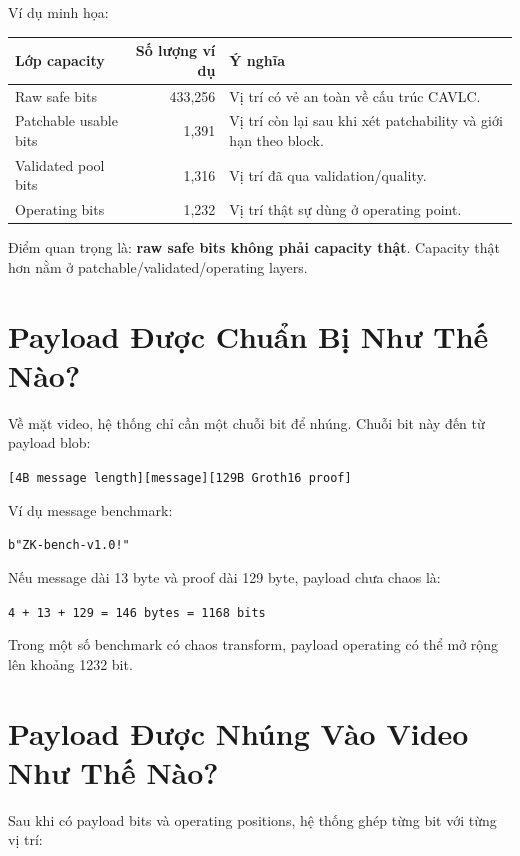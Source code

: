 \documentclass[11pt,a4paper]{article}
\begin{document}
Ví dụ minh họa:

\begin{center}
\begin{tabular}{lrp{70mm}}
\toprule
Lớp capacity & Số lượng ví dụ & Ý nghĩa \\
\midrule
Raw safe bits & 433,256 & Vị trí có vẻ an toàn về cấu trúc CAVLC. \\
Patchable usable bits & 1,391 & Vị trí còn lại sau khi xét patchability và giới hạn theo block. \\
Validated pool bits & 1,316 & Vị trí đã qua validation/quality. \\
Operating bits & 1,232 & Vị trí thật sự dùng ở operating point. \\
\bottomrule
\end{tabular}
\end{center}

Điểm quan trọng là: \textbf{raw safe bits không phải capacity thật}. Capacity
thật hơn nằm ở patchable/validated/operating layers.

\section{Payload Được Chuẩn Bị Như Thế Nào?}

Về mặt video, hệ thống chỉ cần một chuỗi bit để nhúng. Chuỗi bit này đến từ
payload blob:

\begin{center}
\texttt{[4B message length][message][129B Groth16 proof]}
\end{center}

Ví dụ message benchmark:

\begin{center}
\texttt{b"ZK-bench-v1.0!"}
\end{center}

Nếu message dài 13 byte và proof dài 129 byte, payload chưa chaos là:

\begin{center}
\texttt{4 + 13 + 129 = 146 bytes = 1168 bits}
\end{center}

Trong một số benchmark có chaos transform, payload operating có thể mở rộng lên
khoảng 1232 bit.

\section{Payload Được Nhúng Vào Video Như Thế Nào?}

Sau khi có payload bits và operating positions, hệ thống ghép từng bit với từng
vị trí:
\end{document}
